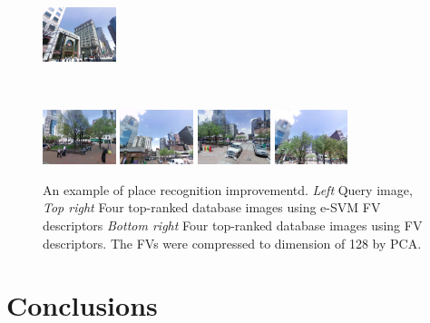 \documentclass[table]{article} %
\begin{document}
\begin{figure}
\begin{minipage}{0.75\linewidth}
\begin{minipage}{\linewidth}
                \colorbox{myGreen}{\includegraphics[height=16mm]{imgs/ex2/FVsvm4}}
            \end{minipage}
            \\
            \begin{minipage}{\linewidth}
                \colorbox{myRed}{\includegraphics[height=16mm]{imgs/ex2/FV1}}
                \colorbox{myRed}{\includegraphics[height=16mm]{imgs/ex2/FV2}}
                \colorbox{myRed}{\includegraphics[height=16mm]{imgs/ex2/FV3}}
                \colorbox{myRed}{\includegraphics[height=16mm]{imgs/ex2/FV4}}
            \end{minipage} 
        \end{minipage}
        \caption{
            An example of place recognition improvementd. \emph{Left} Query image, \emph{Top right} Four top-ranked database images using e-SVM FV descriptors \emph{Bottom right} Four top-ranked database images using FV descriptors. The FVs were compressed to dimension of 128 by PCA.
        }
    \end{figure}



\section{Conclusions}





\small{
	
	
	}
\end{document}
